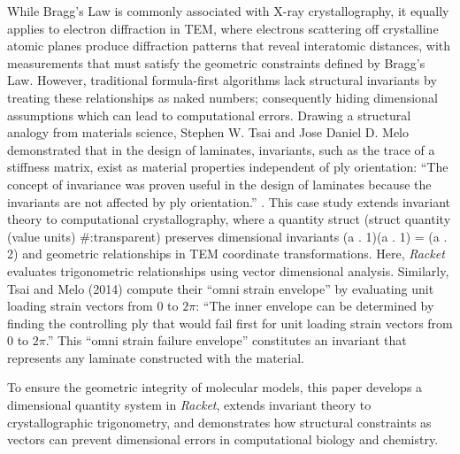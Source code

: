 \documentclass[man]{apa7}
\DeclareRobustCommand{\code}[1]{%
	\begingroup
	\setlength{\fboxsep}{2pt}%
	\colorbox{gray!15}{\ttfamily\small #1}%
	\endgroup
}
\begin{document}
	While Bragg's Law is commonly associated with X-ray crystallography, it equally applies to electron diffraction in TEM, where electrons scattering off crystalline atomic planes produce diffraction patterns that reveal interatomic distances, with measurements that must satisfy the geometric constraints defined by Bragg's Law. However, traditional formula-first algorithms lack structural invariants by treating these relationships as naked numbers; consequently hiding dimensional assumptions which can lead to computational errors. Drawing a structural analogy from materials science, Stephen W. Tsai and Jose Daniel D. Melo demonstrated that in the design of laminates, invariants, such as the trace of a stiffness matrix, exist as material properties independent of ply orientation: ``The concept of invariance was proven useful in the design of laminates because the invariants are not affected by ply orientation.'' \parencite{2014Tsai}. \linebreak This case study extends invariant theory to computational crystallography, where a quantity struct \code{(struct quantity (value units) \#:transparent)} preserves dimensional invariants \code{(a . 1)(a . 1) = (a . 2)} and geometric relationships in TEM coordinate transformations. Here, \textit{Racket} evaluates trigonometric relationships using vector dimensional analysis. Similarly, Tsai and Melo (2014) compute their ``omni strain envelope'' by evaluating unit loading strain vectors from \(0\) to \(2\pi\): ``The inner envelope can be determined by finding the controlling ply that would fail first for unit loading strain vectors from 0 to \(2\pi\).'' This ``omni strain failure envelope'' constitutes an invariant that represents any laminate constructed with the material.
	
	To ensure the geometric integrity of molecular models, this paper develops a dimensional quantity system in \textit{Racket}, extends invariant theory to crystallographic trigonometry, and demonstrates how structural constraints as vectors can prevent dimensional errors in computational biology and chemistry.
	
	
	
	
	 
	
	

	\printbibliography
\end{document}
